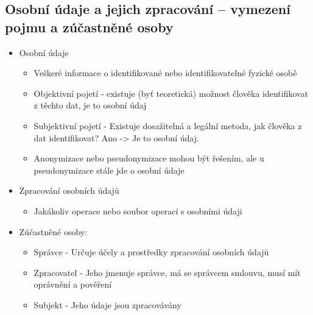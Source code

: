 \subsection{Osobní údaje a jejich zpracování -- vymezení pojmu a zúčastněné osoby}
\begin{itemize}
    \item Osobní údaje
    \begin{itemize}
        \item Veškeré informace o identifikované nebo identifikovatelné fyzické osobě
        \item Objektivní pojetí - existuje (byť teoretická) možnost člověka identifikovat z těchto dat, je to osobní údaj
        \item Subjektivní pojetí - Existuje dosažitelná a legální metoda, jak člověka z dat identifikovat? Ano -> Je to osobní údaj.
        \item Anonymizace nebo pseudonymizace mohou být řešením, ale u pseudonymizace stále jde o osobní údaje
    \end{itemize}
    \item Zpracování osobních údajů
    \begin{itemize}
        \item Jakákoliv operace nebo soubor operací s osobními údaji
    \end{itemize}
    \item Zúčastněné osoby:
    \begin{itemize}
        \item Správce - Určuje účely a prostředky zpracování osobních údajů
        \item Zpracovatel - Jeho jmenuje správce, má se správcem smlouvu, musí mít oprávnění a pověření
        \item Subjekt - Jeho údaje jsou zpracovávány
    \end{itemize}
\end{itemize}

